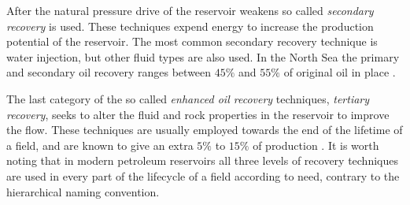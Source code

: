 After the natural pressure drive of the reservoir weakens so called \emph{secondary recovery} is used. These techniques expend energy to increase the production potential of the reservoir. The most common secondary recovery technique is water injection, but other fluid types are also used. In the North Sea the primary and secondary oil recovery ranges between $45\%$ and $55 \%$ of original oil in place \citep{green_enhanced_2003}. 

The last category of the so called \emph{enhanced oil recovery} techniques, \emph{tertiary recovery}, seeks to alter the fluid and rock properties in the reservoir to improve the flow. These techniques are usually employed towards the end of the lifetime of a field, and are known to give an extra $5\%$ to $15\%$ of production \citep{tzimas_enhanced_2005}. It is worth noting that in modern petroleum reservoirs all three levels of recovery techniques are used in every part of the lifecycle of a field according to need, contrary to the hierarchical naming convention.


